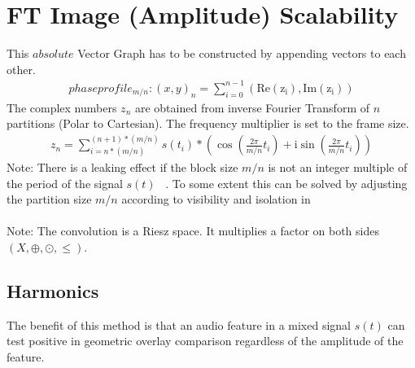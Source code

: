\documentclass{report}
\begin{document}
\section{FT Image (Amplitude) Scalability}
This $absolute$ Vector Graph has to be constructed by appending vectors to each other.
\begin{align}
phaseprofile_{m/n}: (x,y)_{n}=\sum \limits _{i=0}^{n-1}(\mathrm{Re(z_{i})},\mathrm{Im(z_{i})})
\end{align}
The complex numbers $z_{n}$ are obtained from inverse Fourier Transform of $n$ partitions (Polar to Cartesian). The frequency multiplier is set to the frame size.
\begin{align}
z_{n}= \sum \limits _{i=n*(m/n)}^{(n+1)*(m/n)} s(t_{i})*(\cos(\frac{2\pi}{m/n}t_{i})+\mathrm{i}\sin(\frac{2\pi}{m/n}t_{i}))\label{eq:3}
\end{align}
Note: There is a leaking effect if the block size $m/n$ is not an integer multiple of the period of the signal $s(t)$ ~\cite[Fensterfunktion]{Fensterfunktion}. To some extent this can be solved by adjusting the partition size $m/n$ according to visibility and isolation in ~\cite[Stopeight\_Comparator.tex]{Comparator}\\\\
Note: The convolution is a Riesz space. It multiplies a factor on both sides $(X,\oplus,\odot,\leq)$.
\subsection{Harmonics}
The benefit of this method is that an audio feature in a mixed signal $s(t)$ can test positive in geometric overlay comparison regardless of the amplitude of the feature.

\iffalse
\printbibliography
\fi
{}

\end{document}
